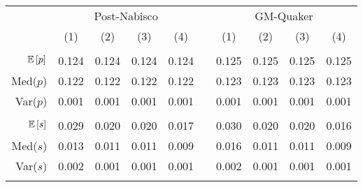 \begin{tabular}{r|ccccccccc}
 & \multicolumn{4}{c}{Post-Nabisco} & & \multicolumn{4}{c}{GM-Quaker} \\ 
 & (1) & (2) & (3) & (4) && (1) & (2) & (3) & (4) \\\hline&&&&&&&&&\\ 
$\mathbb{E}\left[p\right]$ & 0.124 & 0.124  & 0.124  & 0.124&& 0.125 & 0.125  & 0.125  & 0.125 \\ 
Med($p$)& 0.122 & 0.122 & 0.122 & 0.122&& 0.123 & 0.123  & 0.123  & 0.123 \\ 
Var($p$)& 0.001 & 0.001 & 0.001 & 0.001&& 0.001 & 0.001  & 0.001  & 0.001 \\
 &&&&&&&&&\\ 
$\mathbb{E}\left[s\right]$ & 0.029 & 0.020  & 0.020  & 0.017&& 0.030 & 0.020  & 0.020  & 0.016 \\ 
Med($s$)& 0.013 & 0.011 & 0.011 & 0.009&& 0.016 & 0.011  & 0.011  & 0.009 \\ 
Var($s$)& 0.002 & 0.001 & 0.001 & 0.001&& 0.002 & 0.001  & 0.001  & 0.001 \\
 &&&&&&&&&\\ 
\end{tabular}
